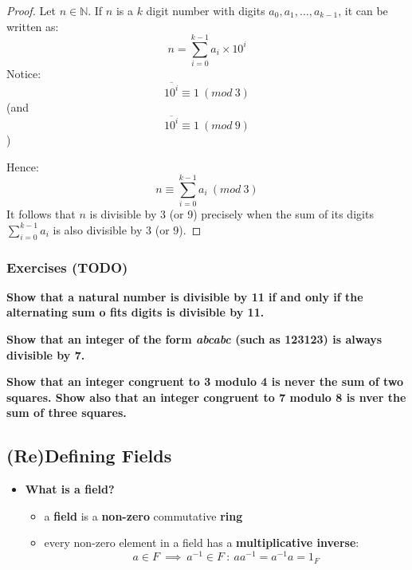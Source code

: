\documentclass{exam}
\begin{document}

\begin{proof}

Let $n \in \mathbb{N}$. If $n$ is a $k$ digit number with digits $a_0, a_1, \ldots, a_{k-1}$, it can be written as:
\[
n = \sum_{i = 0}^{k-1} a_i \times 10^i
\]
Notice:
\[
\overline{10^i} \equiv 1 \ (mod \ 3)
\]
(and 
\[
\overline{10^i} \equiv 1 \ (mod \ 9)
\]
)

\bigskip

Hence:
\[
n \equiv \sum_{i = 0}^{k-1} a_i  \ (mod \ 3)
\]
It follows that $n$ is divisible by 3 (or 9) precisely when the sum of its digits $\sum_{i = 0}^{k-1} a_i$ is also divisible by 3 (or 9).

\end{proof}

\subsubsection{Exercises (TODO)}

\begin{questions}

\question \textbf{Show that a natural number is divisible by 11 if and only if the alternating sum o fits digits is divisible by 11.}

\question \textbf{Show that an integer of the form \textit{abcabc} (such as 123123) is always divisible by 7.}

\question \textbf{Show that an integer congruent to 3 modulo 4 is never the sum of two squares. Show also that an integer congruent to 7 modulo 8 is nver the sum of three squares.}

\end{questions}

\subsection{(Re)Defining Fields}

\begin{itemize}
    \item \textbf{What is a field?}
    \begin{itemize}
        \item a \textbf{field} is a \textbf{non-zero} commutative \textbf{ring}
        \item every non-zero element in a field has a \textbf{multiplicative inverse}:
        \[
        a \in F \ \implies \ a^{-1} \in F \ : \ aa^{-1} = a^{-1}a = 1_F
        \]
    \end{itemize}
\end{itemize}
\end{document}
